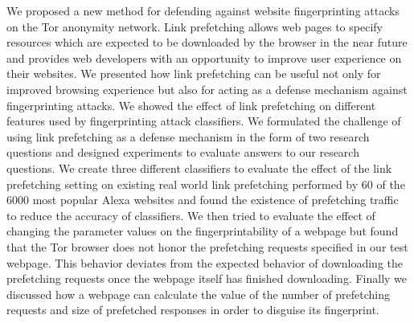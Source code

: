 

We proposed a new method for defending against website fingerprinting attacks on the Tor anonymity network. 
Link prefetching allows web pages to specify resources which are expected to be downloaded by the browser in the near future and provides web developers with an opportunity to improve user experience on their websites. 
We presented how link prefetching can be useful not only for improved browsing experience but also for acting as a defense mechanism against fingerprinting attacks. 
We showed the effect of link prefetching on different features used by fingerprinting attack classifiers. 
We formulated the challenge of using link prefetching as a defense mechanism in the form of two research questions and designed experiments to evaluate answers to our research questions. 
We create three different classifiers to evaluate the effect of the link prefetching setting on existing real world link prefetching performed by 60 of the 6000 most popular Alexa websites and found the existence of prefetching traffic to reduce the accuracy of classifiers.
We then tried to evaluate the effect of changing the parameter values on the fingerprintability of a webpage but found that the Tor browser does not honor the prefetching requests specified in our test webpage. This behavior deviates from the expected behavior of downloading the prefetching requests once the webpage itself has finished downloading. Finally we discussed how a webpage can calculate the value of the number of prefetching requests and size of prefetched responses in order to disguise its fingerprint. 
